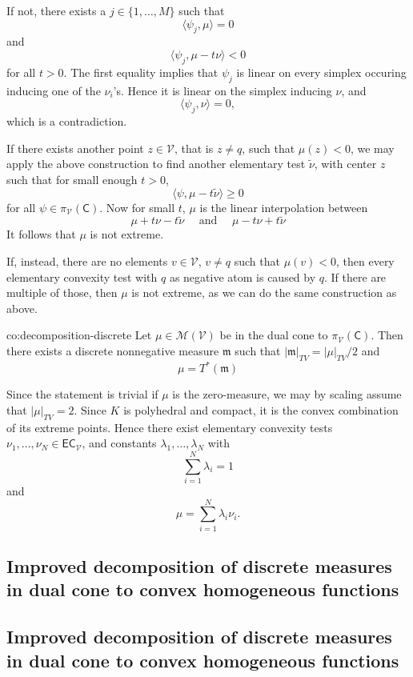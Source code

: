 \documentclass[12pt]{amsart}
\let\Subsection=\subsection
\renewcommand{\subsection}[2][empty]{%
  \ifthenelse{\equal{#1}{empty}}%
               {\xdef\SubsectionName{#2}%
                \Subsection{#2}}%
               {\xdef\SubsectionName{#1}%
                \Subsection[#1]{#2}}%
}
\begin{document}
\begin{Proof}
If not, there exists a $j \in \{1, \dots, M\}$ such that 
\[
\langle \psi_j, \mu \rangle = 0
\]
and 
\[
\langle \psi_j, \mu - t \nu \rangle < 0
\]
for all $t>0$. The first equality implies that $\psi_j$ is linear on every simplex occuring inducing one of the $\nu_i$'s. Hence it is linear on the simplex inducing $\nu$, and 
\[
\langle \psi_j, \nu \rangle = 0,
\]
which is a contradiction.

If there exists another point $z \in \mathcal{V}$, that is $z \neq q$, such that $\mu(z) < 0$, we may apply the above construction to find another elementary test $\tilde{\nu}$, with center $z$ such that for small enough $t>0$, 
\[
\langle \psi , \mu - t \tilde{\nu} \rangle \geq 0
\]
for all $\psi \in \pi_{\mathcal{V}}(\mathsf{C})$. Now for small $t$, $\mu$ is the linear interpolation between
\[
\mu + t \nu - t \tilde{\nu} \quad \text{ and } \quad \mu - t\nu + t\tilde{\nu}
\]
It follows that $\mu$ is not extreme.

If, instead, there are no elements $v \in \mathcal{V}$, $v \neq q$ such that $\mu(v) <0$, then every elementary convexity test with $q$ as negative atom is caused by $q$. If there are multiple of those, then $\mu$ is not extreme, as we can do the same construction as above.
\end{Proof}

\begin{corollary}{co:decomposition-discrete}
Let $\mu \in \mathcal{M}(\mathcal{V})$ be in the dual cone to $\pi_{\mathcal{V}} (\mathsf{C})$. Then there exists a discrete nonnegative measure $\mathfrak{m}$ such that $|\mathfrak{m}|_{TV} = |\mu|_{TV}/2$ and 
\[
\mu = T^*(\mathfrak{m})
\]
\end{corollary}

\begin{Proof}
Since the statement is trivial if $\mu$ is the zero-measure, we may by scaling assume that $|\mu|_{TV} = 2$. Since $K$ is polyhedral and compact, it is the convex combination of its extreme points. Hence there exist elementary convexity tests $\nu_1, \dots, \nu_N \in \mathsf{EC}_{\mathcal{V}}$, and constants $\lambda_1, \dots, \lambda_N$ with
\[
\sum_{i=1}^N \lambda_i =1
\]
and
\[
\mu = \sum_{i=1}^N \lambda_i \nu_i.
\]
\end{Proof}

\subsection{Improved decomposition of discrete measures in dual cone to convex homogeneous functions}
\end{document}
